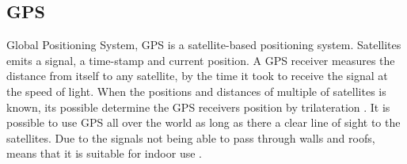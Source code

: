
\subsection{GPS}

Global Positioning System, GPS is a satellite-based positioning system. Satellites emits a signal, a time-stamp and current position. A GPS receiver measures the distance from itself to any satellite, by the time it took to receive the signal at the speed of light. When the positions and distances of multiple of satellites is known, its possible determine the GPS receivers position by trilateration \cite{Dempster2013}. It is possible to use GPS all over the world as long as there a clear line of sight to the satellites. Due to the signals not being able to pass through walls and roofs, means that it is suitable for indoor use \cite{GPS_about}.